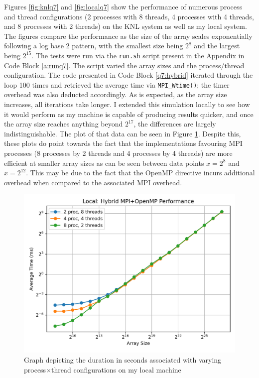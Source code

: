 \documentclass[11pt]{article}
\begin{document}
Figures \ref{fig:knlq7} and \ref{fig:localq7} show the performance of numerous process and thread configurations (2 processes with 8 threads, 4 processes with 4 threads, and 8 processes with 2 threads) on the KNL system as well as my local system.
The figures compare the performance as the size of the array scales exponentially following a log base 2 pattern, with the smallest size being $2^8$ and the largest being $2^{15}$.
The tests were run via the \texttt{run.sh} script present in the Appendix in Code Block \ref{a:runq7}.
The script varied the array sizes and the process/thread configuration.
The code presented in Code Block \ref{q7:hybrid} iterated through the loop 100 times and retrieved the average time via \texttt{MPI\_Wtime()}; the timer overhead was also deducted accordingly.
As is expected, as the array size increases, all iterations take longer.
I extended this simulation locally to see how it would perform as my machine is capable of producing results quicker, and once the array size reaches anything beyond $2^{17}$, the differences are largely indistinguishable.
The plot of that data can be seen in Figure \ref{fig:bigq7}.
Despite this, these plots do point towards the fact that the implementations favouring MPI processes (8 processes by 2 threads and 4 processes by 4 threads) are more efficient at smaller array sizes as can be seen between data points $x=2^8$ and $x=2^{12}$.
This may be due to the fact that the OpenMP directive incurs additional overhead when compared to the associated MPI overhead.

\begin{figure}[ht]
\centering
    \includegraphics[width=\textwidth]{./images/bigq7.png}
\caption{Graph depicting the duration in seconds associated with varying process$\times$thread configurations on my local machine}
\label{fig:bigq7}
\end{figure}
\end{document}
